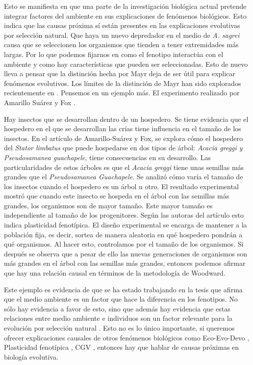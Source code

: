 Esto se manifiesta en que una parte de la investigación biológica actual pretende integrar factores del ambiente en sus explicaciones de fenómenos biológicos. Esto indica que las causas próxima sí están presentes en las explicaciones evolutivas por selección natural. Que haya un nuevo depredador en el medio de \emph{A. sagrei} causa que se seleccionen los organismos que tienden a tener extremidades más largas. Por lo que podemos fijarnos en como el fenotipo interactúa con el ambiente y como hay características que pueden ser seleccionadas. Esto de nuevo lleva a pensar que la distinción hecha por Mayr deja de ser útil para explicar fenómenos evolutivos. Los límites de la distinción de Mayr han sido explorados recientemente en \cite{Uller2020, Dayan2020, Laland2011}. Pensemos en un ejemplo más. El experimento realizado por Amarillo Suárez y Fox \citeyear{Amarillo-Suarez2006}.

Hay insectos que se desarrollan dentro de un hospedero. Se tiene evidencia que el hospedero en el que se desarrollan las crías tiene influencia en el tamaño de los insectos. En el artículo de Amarillo-Suárez y Fox, se explora cómo el hospedero del \emph{Stator limbatus} que puede hospedarse en dos tipos de árbol: \emph{Acacia greggi y Pseudosamanea guachapele}, tiene consecuencias en su desarrollo. Las particularidades de estos árboles es que el \emph{Acacia greggi} tiene unas semillas más grandes que el \emph{Pseudosamanea Guachapele}. Se analizó cómo varía el tamaño de los insectos cuando el hospedero es un árbol u otro. El resultado experimental mostró que cuando este insecto se hospeda en el árbol con las semillas más grandes, los organismos son de mayor tamaño. Este mayor tamaño es independiente al tamaño de los progenitores. Según las autoras del artículo esto indica plasticidad fenotípica. El diseño experimental se encarga de mantener a la población fija, es decir, sortea de manera aleatoria en qué hospedero pondrán a qué organismos. Al hacer esto, controlamos por el tamaño de los organismos. Si después se observa que a pesar de ello las nuevas generaciones de organismos son más grandes en el árbol con las semillas más grandes, entonces podemos afirmar que hay una relación causal en términos de la metodología de Woodward.

Este ejemplo es evidencia de que se ha estado trabajando en la tesis que afirma que el medio ambiente es un factor que hace la diferencia en los fenotipos. No sólo hay evidencia a favor de esto, sino que además hay evidencia que estas relaciones entre medio ambiente e individuos son un factor relevante para la evolución por selección natural \cite{Jablonka2020, Dayan2020, MacColl2011}. Esto no es lo único importante, si queremos ofrecer explicaciones causales de otros fenómenos biológicos como Eco-Evo-Devo \cite{PfenningEco-Evo-Devo}, Plasticidad fenotípica \cite{WESTEBERHARD20082701}, CGV \cite{CVG}, entonces hay que hablar de causas próximas en biología evolutiva.

